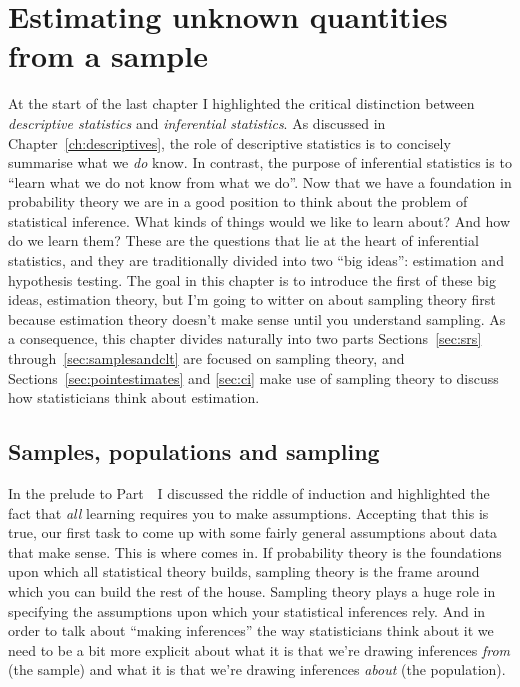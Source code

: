 
\chapter{Estimating unknown quantities from a sample\label{ch:estimation}}

 
At the start of the last chapter I highlighted the critical distinction between {\it descriptive statistics} and {\it inferential statistics}. As discussed in Chapter~\ref{ch:descriptives}, the role of descriptive statistics is to concisely summarise what we {\it do} know. In contrast, the purpose of inferential statistics is to ``learn what we do not know from what we do''. Now that we have a foundation in probability theory we are in a good position to think about the problem of statistical inference. What kinds of things would we like to learn about? And how do we learn them? These are the questions that lie at the heart of inferential statistics, and they are traditionally divided into two ``big ideas'': estimation and hypothesis testing. The goal in this chapter is to introduce the first of these big ideas, estimation theory, but I'm going to witter on about sampling theory first because estimation theory doesn't make sense until you understand sampling. As a consequence, this chapter divides naturally into two parts Sections~\ref{sec:srs} through~\ref{sec:samplesandclt} are focused on sampling theory, and Sections~\ref{sec:pointestimates} and \ref{sec:ci} make use of sampling theory to discuss how statisticians think about estimation.


\section{Samples, populations and sampling~\label{sec:srs}}

In the prelude to Part~\thepart\ I discussed the riddle of induction and highlighted the fact that {\it all} learning requires you to make assumptions. Accepting that this is true, our first task to come up with some fairly general assumptions about data that make sense. This is where  comes in. If probability theory is the foundations upon which all statistical theory builds, sampling theory is the frame around which you can build the rest of the house. Sampling theory plays a huge role in specifying the assumptions upon which your statistical inferences rely. And in order to talk about ``making inferences'' the way statisticians think about it we need to be a bit more explicit about what it is that we're drawing inferences {\it from} (the sample) and what it is that we're drawing inferences {\it about} (the population).  


